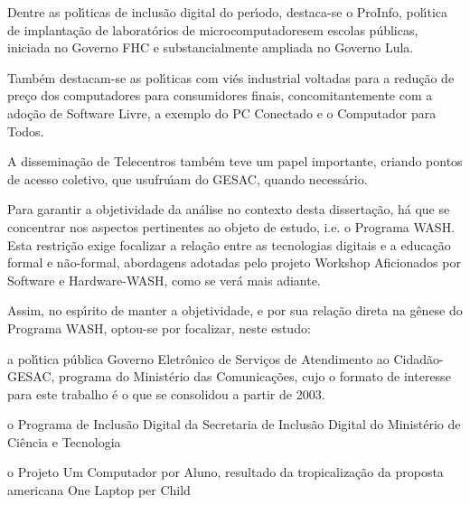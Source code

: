 \documentclass[
12pt,		%
openright,	%
twoside,  %
a4paper,			%
chapter=TITLE,		%
english,			%
french,				%
spanish,			%
brazil				%
]{USPSC-classe/USPSC}
\begin{document}
Dentre as pol\'{\i}ticas de inclus\~ao digital do per\'{\i}odo, destaca-se o ProInfo, pol\'{\i}tica de implanta\c{c}\~ao de \textquotedbl laborat\'orios de microcomputadores\textquotedbl  em escolas p\'ublicas, iniciada no Governo FHC e substancialmente ampliada no Governo Lula.









Tamb\'em destacam-se as pol\'{\i}ticas com vi\'es industrial voltadas para a redu\c{c}\~ao de pre\c{c}o dos computadores para consumidores finais, concomitantemente com a ado\c{c}\~ao de Software Livre, a exemplo do PC Conectado e o Computador para Todos.









A dissemina\c{c}\~ao de Telecentros tamb\'em teve um papel importante, criando pontos de acesso coletivo, que usufru\'{\i}am do GESAC, quando necess\'ario.









Para garantir a objetividade da an\'alise no contexto desta disserta\c{c}\~ao, h\'a que se concentrar nos aspectos pertinentes ao objeto de estudo, i.e. o Programa WASH. Esta restri\c{c}\~ao exige focalizar a rela\c{c}\~ao entre as tecnologias digitais e a educa\c{c}\~ao formal e n\~ao-formal, abordagens adotadas pelo projeto Workshop Aficionados por Software e Hardware-WASH, como se ver\'a mais adiante.









Assim, no esp\'{\i}rito de manter a objetividade, e por sua rela\c{c}\~ao direta na g\^enese do Programa WASH, optou-se por focalizar, neste estudo:










\begin{alineas}
\item a pol\'{\i}tica p\'ublica \textquotedbl Governo Eletr\^onico de Servi\c{c}os de Atendimento ao Cidad\~ao-GESAC\textquotedbl , programa do Minist\'erio das Comunica\c{c}\~oes, cujo o formato de interesse para este trabalho \'e o que se consolidou a partir de 2003.
\item o Programa de Inclus\~ao Digital da Secretaria de Inclus\~ao Digital do Minist\'erio de Ci\^encia e Tecnologia
\item o Projeto Um Computador por Aluno, resultado da tropicaliza\c{c}\~ao da proposta americana \textquotedbl One Laptop per Child\textquotedbl 
\end{alineas}
\end{document}

